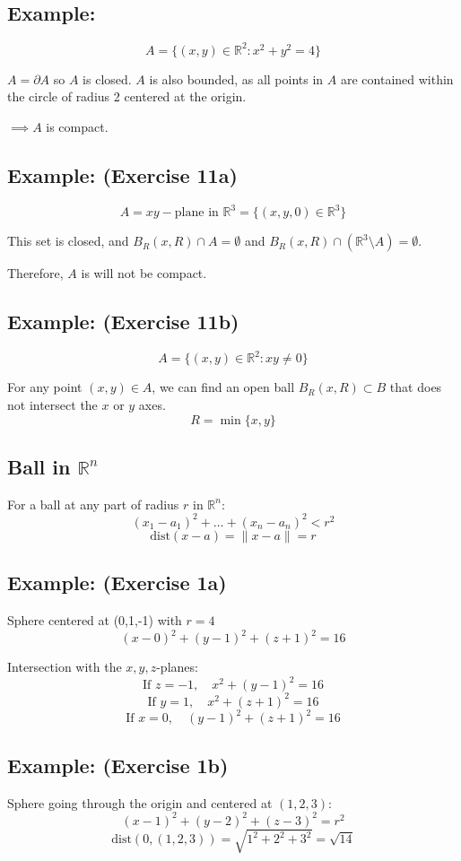 \documentclass[11pt]{article}
\begin{document}
\subsection*{Example:}
\[
A = \{(x,y) \in \mathbb{R}^2 : x^2 + y^2 = 4\}
\]

$A = \partial A$ so $A$ is closed. $A$ is also bounded, as all points in $A$ are contained within the circle of radius 2 centered at the origin.

$\implies A$ is compact.

\subsection*{Example: (Exercise 11a)}
\[
A = xy-\text{plane in } \mathbb{R}^3 = \{(x,y,0) \in \mathbb{R}^3\}
\]

This set is closed, and $B_R(x, R) \cap A = \emptyset$ and $B_R(x, R) \cap (\mathbb{R}^3 \setminus A) = \emptyset$.

Therefore, $A$ is will not be compact.

\subsection*{Example: (Exercise 11b)}
\[
A = \{(x,y) \in \mathbb{R}^2 : xy \ne 0\}
\]

For any point $(x,y) \in A$, we can find an open ball $B_R(x, R) \subset B$ that does not intersect the $x$ or $y$ axes.
\[
R = \min\{x, y\}
\]

\subsection{Ball in $\mathbb{R}^n$}
For a ball at any part of radius $r$ in $\mathbb{R}^n$:
\[
(x_1 - a_1)^2 + \dots + (x_n - a_n)^2 < r^2
\]
\[
\text{dist}(x - a) = \|x - a\| = r
\]

\subsection*{Example: (Exercise 1a)}
Sphere centered at (0,1,-1) with $r = 4$
\[
(x-0)^2 + (y-1)^2 + (z+1)^2 = 16
\]

Intersection with the $x,y,z$-planes:
\[
\text{If } z = -1, \quad x^2 + (y-1)^2 = 16
\]
\[
\text{If } y = 1, \quad x^2 + (z+1)^2 = 16
\]
\[
\text{If } x = 0, \quad (y-1)^2 + (z+1)^2 = 16
\]

\subsection*{Example: (Exercise 1b)}
Sphere going through the origin and centered at $(1,2,3)$:
\[
(x-1)^2 + (y-2)^2 + (z-3)^2 = r^2
\]
\[
\text{dist}(0, (1,2,3)) = \sqrt{1^2 + 2^2 + 3^2} = \sqrt{14}
\]
\end{document}
